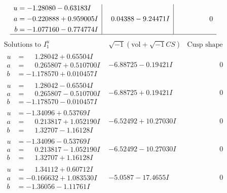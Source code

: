 \documentclass[1p]{elsarticle_modified}
\theoremstyle{definition}
\newcommand{\I}{\sqrt{-1}}
\begin{document}
$$\begin{array}{c|c|c}
\begin{aligned}
u &= -1.28080 - 0.63183 I \\
a &= -0.220888 + 0.959005 I \\
b &= -1.077160 - 0.774774 I\end{aligned}
 & \phantom{-}0.04388 - 9.24471 I & \phantom{-0.000000 } 0\\
 \hline 
 \end{array}$$\newpage$$\begin{array}{c|c|c}  
\text{Solutions to }I^u_{1}& \I (\text{vol} + \sqrt{-1}CS) & \text{Cusp shape}\\
 \hline 
\begin{aligned}
u &= \phantom{-}1.28042 + 0.65504 I \\
a &= \phantom{-}0.265807 + 0.510700 I \\
b &= -1.178570 + 0.010457 I\end{aligned}
 & -6.88725 - 0.19421 I & \phantom{-0.000000 } 0 \\ \hline\begin{aligned}
u &= \phantom{-}1.28042 - 0.65504 I \\
a &= \phantom{-}0.265807 - 0.510700 I \\
b &= -1.178570 - 0.010457 I\end{aligned}
 & -6.88725 + 0.19421 I & \phantom{-0.000000 } 0 \\ \hline\begin{aligned}
u &= -1.34096 + 0.53769 I \\
a &= \phantom{-}0.213817 + 1.052190 I \\
b &= \phantom{-}1.32707 - 1.16128 I\end{aligned}
 & -6.52492 + 10.27030 I & \phantom{-0.000000 } 0 \\ \hline\begin{aligned}
u &= -1.34096 - 0.53769 I \\
a &= \phantom{-}0.213817 - 1.052190 I \\
b &= \phantom{-}1.32707 + 1.16128 I\end{aligned}
 & -6.52492 - 10.27030 I & \phantom{-0.000000 } 0 \\ \hline\begin{aligned}
u &= \phantom{-}1.34112 + 0.60712 I \\
a &= -0.166632 + 1.083530 I \\
b &= -1.36056 - 1.11761 I\end{aligned}
 & -5.0587 - 17.4655 I & \phantom{-0.000000 } 0 \\ \hline\begin{aligned}

\end{aligned}
\end{array}$$
\end{document}
